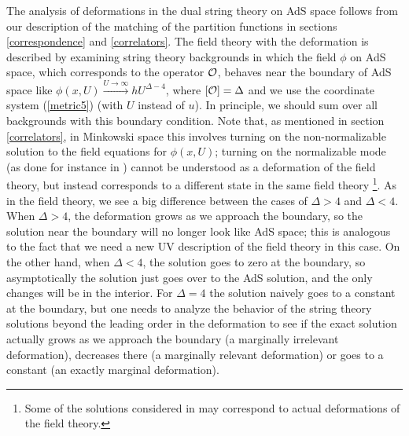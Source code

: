  The analysis of deformations in the dual string theory on AdS space
 follows from our description of the matching of the partition
 functions in sections \ref{correspondence} and \ref{correlators}. 
 The field theory with the deformation
  is described by examining string theory backgrounds in
 which the field $\phi$ on AdS space, which corresponds to the
 operator $\cal O$, behaves near the boundary of AdS space like
 $\phi(x,U) \stackrel{U\to \infty}{\longrightarrow} hU^{\Delta-4}$,
 where $[{\cal O}] = \Delta$ and we use the coordinate system 
 (\ref{metric5}) (with $U$ instead of $u$). In
 principle, we should sum over all backgrounds with this boundary
 condition. Note that, as mentioned in section \ref{correlators}, 
 in Minkowski space
 this involves turning on the non-normalizable solution to the field
 equations for $\phi(x,U)$; turning on the normalizable mode (as done
 for instance in
 \cite{Nojiri:1998yx,
 Kehagias:1999tr,Gubser:1999pk,Girardello:1999hj,Liu:1999fc,
 Kehagias:1999iy,Constable:1999ch}) 
 cannot be understood as a deformation of the field
 theory, but instead corresponds to a different state in the same
 field theory \cite{Balasubramanian:1999sn}\footnote{Some of the
 solutions considered in \cite{Girardello:1999hj} may correspond 
 to actual deformations of the field theory.}. As in the field theory,
 we see a big difference between the cases of $\Delta > 4$ and $\Delta
 < 4$. When $\Delta > 4$, the deformation grows as we approach the
 boundary, so the solution near the boundary will no longer look like
 AdS space; this is analogous to the fact that we need a new UV
 description of the field theory in this case. On the other hand, when
 $\Delta < 4$, the solution goes to zero at the boundary, so
 asymptotically the solution just goes over to the AdS solution, and
 the only changes will be in the interior. For $\Delta=4$ the solution
 naively goes to a constant at the boundary, but one needs to analyze
 the behavior of the string theory solutions beyond the leading order
 in the deformation to see if the exact solution actually grows as we
 approach the boundary (a marginally irrelevant deformation),
 decreases there (a marginally relevant deformation) or goes to a
 constant (an exactly marginal deformation).

